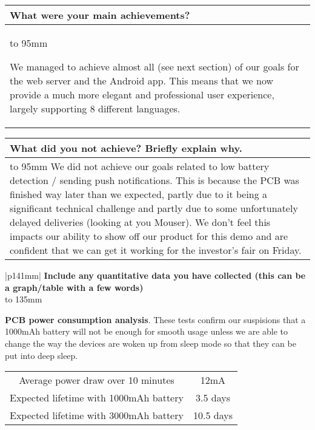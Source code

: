 \documentclass[a4paper]{article}
\newcommand{\colWidth}{141mm}
\begin{document}
\begin{center}

\begin{tabular}{|p{\colWidth}|}
	\hline
	\cellcolor{blue!25}\large
	\textbf{What were your main achievements?}
	\\ \hline
	\vtop to 95mm{
		We managed to achieve almost all (see next section) of our goals for the web server and the Android app.
		This means that we now provide a much more elegant and professional user experience,
		largely supporting 8 different languages.

  }
  \\
  \hline
\end{tabular}
\vskip 5mm


\begin{tabular}{|p{\colWidth}|}
	\hline
	\cellcolor{blue!25}\large
	\textbf{What did you not achieve? Briefly explain why.}
	\\ \hline
	\vtop to 95mm{
		We did not achieve our goals related to low battery detection / sending push notifications. This is because the PCB
		was finished way later than we expected, partly due to it being a significant technical challenge and partly due to some
		unfortunately delayed deliveries (looking at you Mouser). We don't feel this impacts our ability to show off our product
		for this demo and are confident that we can get it working for the investor's fair on Friday.
  }
  \\
  \hline
\end{tabular}
\vskip 5mm


\begin{tabular}{|p{\colWidth}|}
	\hline
	\large
	\textbf{Include any quantitative data you have collected (this can be a graph/table with a few words)}
	\\ \hline
	\vtop to 135mm{

	\textbf{PCB power consumption analysis}. These tests confirm our suspisions that a 1000mAh battery will not be enough for smooth usage unless
	we are able to change the way the devices are woken up from sleep mode so that they can be put into deep sleep.

	\vspace{3mm}

	\begin{tabular}{| c | c |} \hline
		Average power draw over 10 minutes & 12mA \\
		Expected lifetime with 1000mAh battery & 3.5 days \\
		Expected lifetime with 3000mAh battery & 10.5 days \\ \hline
	\end{tabular}

}
\end{tabular}
\end{center}
\end{document}

